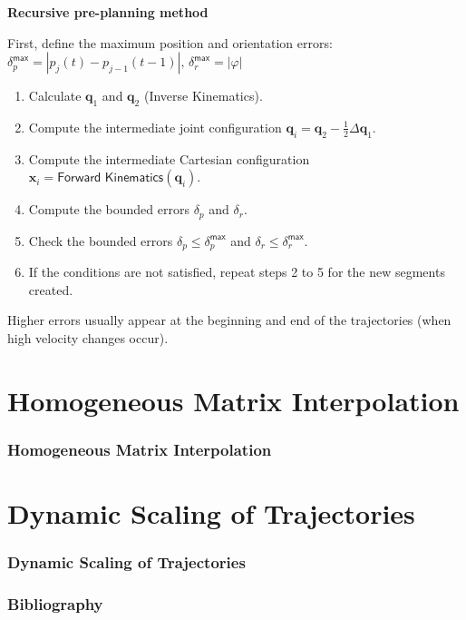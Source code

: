 \documentclass[10pt, aspectratio=169]{beamer}
\theoremstyle{remark}
\theoremstyle{definition}
\begin{document}
\begin{frame}[allowframebreaks]
    \framebreak

    \textbf{\textcolor{uma_blue_dark}{Recursive pre-planning method}}

    First, define the maximum position and orientation errors:
    $
    \delta_p^{\textsf{max}} = |p_j(t)-p_{j-1}(t-1)|, \, \delta_r^{\textsf{max}} = |\varphi|
    $
    \begin{enumerate}
        \item Calculate $\mathbf{q}_1$ and $\mathbf{q}_2$ (Inverse Kinematics).
        \item Compute the intermediate joint configuration $\mathbf{q}_i = \mathbf{q}_2-\frac{1}{2}\Delta\mathbf{q}_1$.
        \item Compute the intermediate Cartesian configuration $\mathbf{x}_i = \textsf{Forward Kinematics}(\mathbf{q}_i)$.
        \item Compute the bounded errors $\delta_p$ and $\delta_r$.
        \item Check the bounded errors $\delta_p \leq \delta_p^{\textsf{max}} $ and $\delta_r \leq \delta_r^{\textsf{max}}$.
        \item If the conditions are not satisfied, repeat steps 2 to 5 for the new segments created.
    \end{enumerate}

    Higher errors usually appear at the beginning and end of the trajectories (when high velocity changes occur).
    


\end{frame}

\section{Homogeneous Matrix Interpolation}
\begin{frame}[allowframebreaks]
\frametitle{Homogeneous Matrix Interpolation}


\end{frame}


\section{Dynamic Scaling of Trajectories}
\begin{frame}[allowframebreaks]
\frametitle{Dynamic Scaling of Trajectories}


\end{frame}




\begin{frame}[allowframebreaks]
\frametitle{Bibliography}
\printbibliography
\end{frame}
\end{document}

